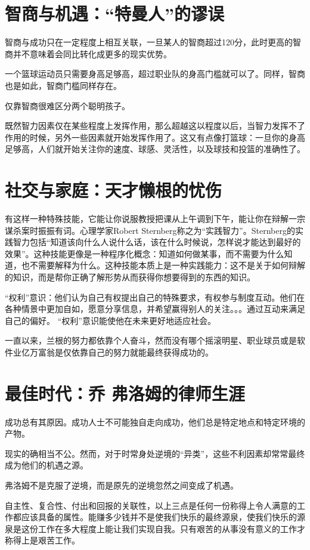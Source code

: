 \documentclass{ctexbook}
\begin{document}
\chapter{智商与机遇：“特曼人”的谬误}

智商与成功只在一定程度上相互关联，一旦某人的智商超过120分，此时更高的智商并不意味着会同比转化成更多的现实优势。

一个篮球运动员只需要身高足够高，超过职业队的身高门槛就可以了。同样，智商也是如此，智商门槛同样存在。

仅靠智商很难区分两个聪明孩子。


既然智力因素仅在某些程度上发挥作用，那么超越这以程度以后，当智力发挥不了作用的时候，另外一些因素就开始发挥作用了。这又有点像打篮球：一旦你的身高足够高，人们就开始关注你的速度、球感、灵活性，以及球技和投篮的准确性了。

\chapter{社交与家庭：天才懒根的忧伤}

有这样一种特殊技能，它能让你说服教授把课从上午调到下午，能让你在辩解一宗谋杀案时振振有词。心理学家Robert Sternberg称之为“实践智力”。Sternberg的实践智力包括“知道该向什么人说什么话，该在什么时候说，怎样说才能达到最好的效果”。这种技能更像是一种程序化概念：知道如何做某事，而不需要为什么知道，也不需要解释为什么。这种技能本质上是一种实践能力：这不是关于如何辩解的知识，而是帮你正确了解形势从而获得你想要得到的东西的知识。

“权利”意识：他们认为自己有权提出自己的特殊要求，有权参与制度互动。他们在各种情景中更加自如，愿意分享信息，并希望赢得别人的关注。。。通过互动来满足自己的偏好。
“权利”意识能使他在未来更好地适应社会。

一直以来，兰根的努力都依靠个人奋斗，然而没有哪个摇滚明星、职业球员或是软件业亿万富翁是仅依靠自己的努力就能最终获得成功的。

\chapter{最佳时代：乔 弗洛姆的律师生涯}

成功总有其原因。成功人士不可能独自走向成功，他们总是特定地点和特定环境的产物。

现实的确相当不公。然而，对于时常身处逆境的“异类”，这些不利因素却常常最终成为他们的机遇之源。

弗洛姆不是克服了逆境，而是原先的逆境忽然之间变成了机遇。

自主性、复合性、付出和回报的关联性，以上三点是任何一份称得上令人满意的工作都应该具备的属性。能赚多少钱并不是使我们快乐的最终源泉，使我们快乐的源泉是这份工作在多大程度上能让我们实现自我。只有艰苦的从事没有意义的工作才称得上是艰苦工作。
\end{document}
